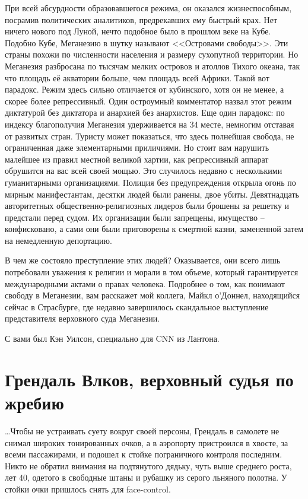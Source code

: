 При всей абсурдности образовавшегося режима, он оказался жизнеспособным, посрамив политических аналитиков, предрекавших ему быстрый крах. Нет ничего нового под Луной, нечто подобное было в прошлом веке на Кубе. Подобно Кубе, Меганезию в шутку называют <<Островами свободы>>. Эти страны похожи по численности населения и размеру сухопутной территории. Но Меганезия разбросана по тысячам мелких островов и атоллов Тихого океана, так что площадь её акватории больше, чем площадь всей Африки. Такой вот парадокс. Режим здесь сильно отличается от кубинского, хотя он не менее, а скорее более репрессивный. Один остроумный комментатор назвал этот режим диктатурой без диктатора и анархией без анархистов. Еще один парадокс: по индексу благополучия Меганезия удерживается на 34 месте, немногим отставая от развитых стран. Туристу может показаться, что здесь полнейшая свобода, не ограниченная даже элементарными приличиями. Но стоит вам нарушить малейшее из правил местной великой хартии, как репрессивный аппарат обрушится на вас всей своей мощью. Это случилось недавно с несколькими гуманитарными организациями. Полиция без предупреждения открыла огонь по мирным манифестантам, десятки людей были ранены, двое убиты. Девятнадцать авторитетных общественно-религиозных лидеров были брошены за решетку и предстали перед судом. Их организации были запрещены, имущество -- конфисковано, а сами они были приговорены к смертной казни, замененной затем на немедленную депортацию.

В чем же состояло преступление этих людей? Оказывается, они всего лишь потребовали уважения к религии и морали в том объеме, который гарантируется международными актами о правах человека. Подробнее о том, как понимают свободу в Меганезии, вам расскажет мой коллега, Майкл о’Доннел, находящийся сейчас в Страсбурге, где недавно завершилось скандальное выступление представителя верховного суда Меганезии.

С вами был Кэн Уилсон, специально для CNN из Лантона.


\mainmatter
\chapter{Грендаль Влков, верховный судья по жребию}

\ldots{}Чтобы не устраивать суету вокруг своей персоны, Грендаль в самолете не снимал широких тонированных очков, а в аэропорту пристроился в хвосте, за всеми пассажирами, и подошел к стойке пограничного контроля последним. Никто не обратил внимания на подтянутого дядьку, чуть выше среднего роста, лет 40, одетого в свободные штаны и рубашку из серого льняного полотна. У стойки очки пришлось снять для face-control.

